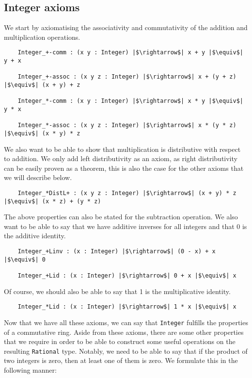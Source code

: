 \documentclass[12pt,twoside,maitrise]{dms}
\theoremstyle{definition}
\numberwithin{equation}{section}
\numberwithin{table}{chapter}
\numberwithin{figure}{chapter}
\newcommand\id[1] {\texttt{#1}}
\begin{document}
\subsection*{Integer axioms}
We start by axiomatising the associativity and commutativity of the addition and multiplication operations.

\begin{verbatim}
    Integer_+-comm : (x y : Integer) |$\rightarrow$| x + y |$\equiv$| y + x

    Integer_+-assoc : (x y z : Integer) |$\rightarrow$| x + (y + z) |$\equiv$| (x + y) + z

    Integer_*-comm : (x y : Integer) |$\rightarrow$| x * y |$\equiv$| y * x

    Integer_*-assoc : (x y z : Integer) |$\rightarrow$| x * (y * z) |$\equiv$| (x * y) * z
\end{verbatim}

We also want to be able to show that multiplication is distributive with respect
to addition. We only add left distributivity as an axiom, as right
distributivity can be easily proven as a theorem, this is also the case for the
other axioms that we will describe below.

\begin{verbatim}
    Integer_*DistL+ : (x y z : Integer) |$\rightarrow$| (x + y) * z |$\equiv$| (x * z) + (y * z)
\end{verbatim}

The above properties can also be stated for the subtraction operation. We also
want to be able to say that we have additive inverses for all integers and that
0 is the additive identity.

\begin{verbatim}
    Integer_+Linv : (x : Integer) |$\rightarrow$| (0 - x) + x |$\equiv$| 0

    Integer_+Lid : (x : Integer) |$\rightarrow$| 0 + x |$\equiv$| x
\end{verbatim}

Of course, we should also be able to say that 1 is the multiplicative identity.

\begin{verbatim}
    Integer_*Lid : (x : Integer) |$\rightarrow$| 1 * x |$\equiv$| x
\end{verbatim}

Now that we have all these axioms, we can say that \id{Integer} fulfills the
properties of a commutative ring. Aside from these axioms, there are some other
properties that we require in order to be able to construct some useful
operations on the resulting \id{Rational} type. Notably, we need to be able to
say that if the product of two integers is zero, then at least one of them is
zero. We formulate this in the following manner:
\end{document}
